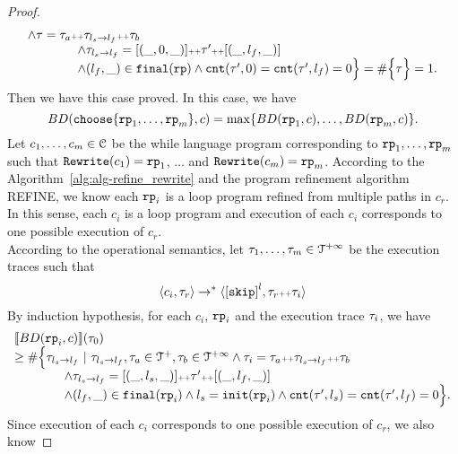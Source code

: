 \begin{proof}
\[\begin{array}{l}
    \land \mathtt{\tau} = \mathtt{\tau}_a {\scriptscriptstyle ++} \mathtt{\tau}_{l_s \to l_f} {\scriptscriptstyle ++} \mathtt{\tau}_b
    \\ \qquad \qquad
    \land \mathtt{\tau}_{l_s \to l_f} = [(\_, 0, \_)] {\scriptscriptstyle ++} \mathtt{\tau}' {\scriptscriptstyle ++} [(\_, l_f, \_)]
    \\ \qquad \qquad
    \land (l_{f}, \_) \in \mathtt{final}(\mathtt{rp})
    \land \mathtt{cnt}(\mathtt{\tau}', 0) = \mathtt{cnt}(\mathtt{\tau}', l_f) = 0 
    \Big\}
     = \# \Big\{\mathtt{\tau} \Big\} = 1.
  \end{array}
\]
Then we have this case proved.
In this case, we have
\[
  BD(\rpchoose{\rprog_1, \ldots, \rprog_m}, c) = \max\left\{ BD(\rprog_1, c), \ldots, BD(\rprog_m, c) \right\}.
\]
Let $c_1, \ldots, c_m \in \mathcal{C}$ be the while language program corresponding to $\mathtt{rp}_1, \ldots, \mathtt{rp}_m$ such that $\mathtt{Rewrite}(c_1) = \mathtt{rp}_1$, $\ldots$ and  $\mathtt{Rewrite}(c_m) = \mathtt{rp}_m$.
According to the Algorithm~\ref{alg:alg-refine_rewrite} and the program refinement algorithm REFINE, we know each $\mathtt{rp}_i$ is a loop program refined from multiple paths in $c_r$.
\\
In this sense, each $c_i$ is a loop program and execution of each $c_i$ corresponds to one possible execution of $c_r$.
\\
According to the operational semantics, let $\mathtt{\tau}_1, \ldots, \mathtt{\tau}_m \in \mathcal{T}^{+\infty}$ be the execution traces such that 
\[
  \config{c_i, \trace_r} \to^* 
  \config{\clabel{\eskip}^{l}, \trace_r \tracecat \trace_i}
\]
By induction hypothesis, for each $c_i$, $\mathtt{rp}_i$ and the execution trace $\mathtt{\tau}_i$, we have 
\[
  \begin{array}{l}
  \llbracket BD(\mathtt{rp}_i, c) \rrbracket(\mathtt{\tau}_0) 
  \\ \geq
  \# \Big\{\mathtt{\tau}_{l_s \to l_f} ~\vert~ \mathtt{\tau}_{l_s \to l_f}, \mathtt{\tau}_a \in \mathcal{T}^{+}, \mathtt{\tau}_b \in \mathcal{T}^{+\infty}
  \land \mathtt{\tau}_i = \mathtt{\tau}_a {\scriptscriptstyle ++} \mathtt{\tau}_{l_s \to l_f} {\scriptscriptstyle ++} \mathtt{\tau}_b
  \\ \qquad \qquad
  \land \mathtt{\tau}_{l_s \to l_f} = [(\_, l_s, \_)] {\scriptscriptstyle ++} \mathtt{\tau}' {\scriptscriptstyle ++} [(\_, l_f, \_)]
  \\ \qquad \qquad
  \land (l_{f}, \_) \in \mathtt{final}(\mathtt{rp}_i)
  \land l_s = \mathtt{init}(\mathtt{rp}_i)
  \land \mathtt{cnt}(\mathtt{\tau}', l_s) = \mathtt{cnt}(\mathtt{\tau}', l_f) = 0 
  \Big\}.
  \end{array}
\]
Since execution of each $c_i$ corresponds to one possible execution of $c_r$, we also know

\end{proof}
